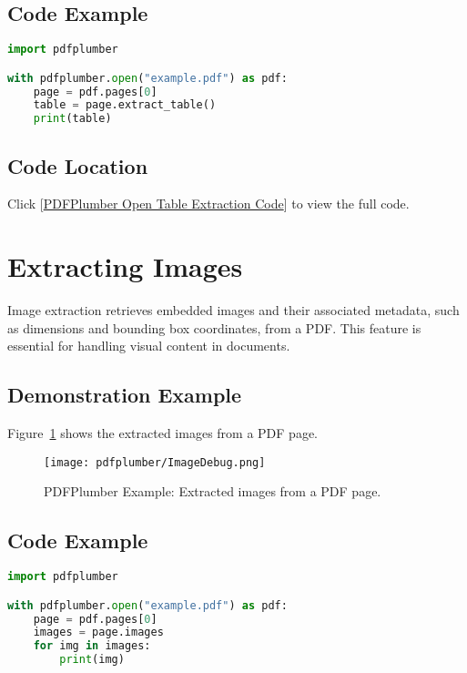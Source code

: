 \subsection{Code Example}
\begin{lstlisting}[language=Python, caption={PDFPlumber Extracting tables from a PDF.}]
import pdfplumber

with pdfplumber.open("example.pdf") as pdf:
    page = pdf.pages[0]
    table = page.extract_table()
    print(table)
\end{lstlisting}

\subsection{Code Location}
Click [\href{run:../Code/General/pdfplumber/table.py}{PDFPlumber Open Table Extraction Code}] to view the full code.

\section{Extracting Images}
\label{sec:extracting images}

Image extraction retrieves embedded images and their associated metadata, such as dimensions and bounding box coordinates, from a PDF. This feature is essential for handling visual content in documents.\cite{Singer:2022}

\subsection{Demonstration Example}
Figure~\ref{fig:PDFPlumber image debug} shows the extracted images from a PDF page.

\begin{figure}[h!]
\centering
\texttt{[image: pdfplumber/ImageDebug.png]}
\caption{PDFPlumber Example: Extracted images from a PDF page.}
\label{fig:PDFPlumber image debug}
\end{figure}

\subsection{Code Example}
\begin{lstlisting}[language=Python, caption={PDFPlumber Extracting images from a PDF.}]
import pdfplumber

with pdfplumber.open("example.pdf") as pdf:
    page = pdf.pages[0]
    images = page.images
    for img in images:
        print(img)
\end{lstlisting}

